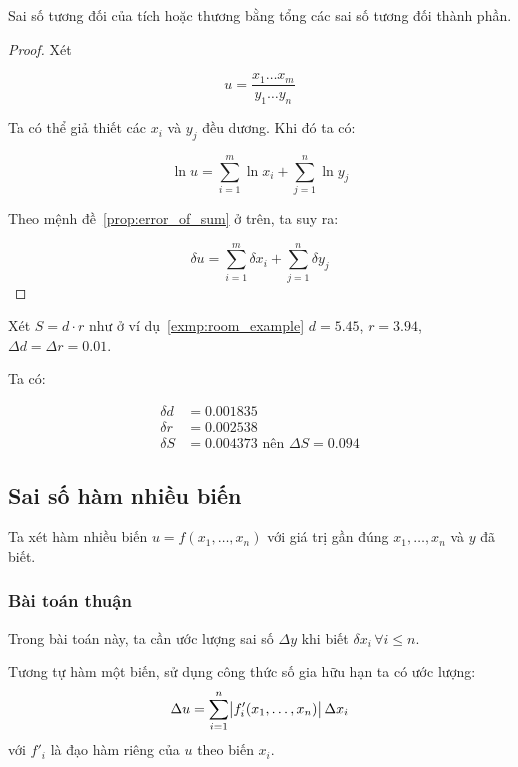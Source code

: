\documentclass[../../Lectures.tex]{subfiles}
\begin{document}
\begin{proposition}
    Sai số tương đối của tích hoặc thương bằng tổng các sai số tương đối thành
    phần.
\end{proposition}

\begin{proof}
    Xét

    \[u = \frac{x_1 \ldots x_m}{y_1 \ldots y_n}\]

    Ta có thể giả thiết các \(x_i\) và \(y_j\) đều dương. Khi đó ta có:

    \[\ln{u} = \sum_{i=1}^{m} \ln{x_i} + \sum_{j=1}^{n} \ln{y_j}\]

    Theo mệnh đề~\ref{prop:error_of_sum} ở trên, ta suy ra:

    \[\delta u = \sum_{i=1}^{m} \delta x_i + \sum_{j=1}^{n} \delta y_j\]
\end{proof}

\begin{exmp}
    Xét \(S = d \cdot r\) như ở ví dụ~\ref{exmp:room_example} \(d =
    \num{5.45}\), \(r = \num{3.94}\), \(\Delta d = \Delta r = \num{0.01}\).

    Ta có:

    \[\begin{aligned}
        \delta d &= \num{0.001835} \\
        \delta r &= \num{0.002538} \\
        \delta S &= \num{0.004373} \text{ nên } \Delta S = \num{0.094}
    \end{aligned}\]
\end{exmp}

\subsection{Sai số hàm nhiều biến}

Ta xét hàm nhiều biến \(u = f(x_1, \ldots, x_n)\) với giá trị gần đúng \(x_1,
\ldots, x_n\) và \(y\) đã biết.

\subsubsection{Bài toán thuận}

Trong bài toán này, ta cần ước lượng sai số \(\Delta y\) khi biết \(\delta x_i
\, \forall i \leq n\).    %

Tương tự hàm một biến, sử dụng công thức số gia hữu hạn ta có ước lượng:
\begin{equation} \label{eq:absolute_error_of_function}
    \Delta u = \sum_{i=1}^{n} \abs{f'_i(x_1, \ldots, x_n)} \Delta x_i
\end{equation}
với \(f'_i\) là đạo hàm riêng của \(u\) theo biến \(x_i\).
\end{document}
